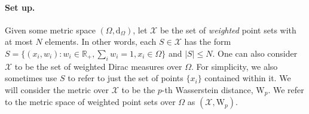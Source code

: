\documentclass[12pt]{article}
\newcommand{\R}{\mathbb R}
\newcommand{\yusu}[1]		{{ \textcolor{darkgreen} {{\sc [Yusu]:} #1}}}
\begin{document}
\paragraph{Set up.} Given some metric space $(\Omega, \mathrm{d}_\Omega)$, let $\mathcal{X}$ be the set of {\it weighted} point sets with at most $N$ elements.
In other words, each $S \in \mathcal{X}$ has the form $S = \{(x_i, w_i) : w_i \in \R_+, \sum_i w_i = 1, x_i \in \Omega\}$ and $|S| \leq N$. One can also consider $\mathcal{X}$ to be the set of weighted Dirac measures over $\Omega$. For simplicity, we also sometimes use $S$ to refer to just the set of points $\{x_i\}$ contained within it. 
We will consider the metric over $\mathcal{X}$ to be the $p$-th Wasserstein distance, $\mathrm{W}_p$. We refer to the metric space of weighted point sets over $\Omega$ as $(\mathcal{X}, \mathrm{W}_p)$.


\end{document}

